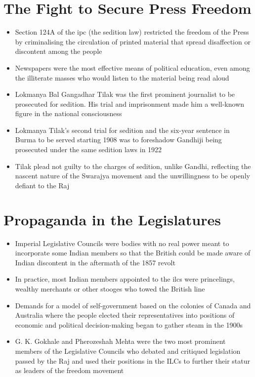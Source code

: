 \section{The Fight to Secure Press Freedom}
\begin{itemize}
    \item Section 124A of the \gls{ipc} (the sedition law) restricted the freedom of the Press by criminalising the circulation of printed material that spread disaffection or discontent among the people
    \item Newspapers were the most effective means of political education, even among the illiterate masses who would listen to the material being read aloud
    \item Lokmanya Bal Gangadhar Tilak was the first prominent journalist to be prosecuted for sedition. His trial and imprisonment made him a well-known figure in the national consciousness
    \item Lokmanya Tilak's second trial for sedition and the six-year sentence in Burma to be served starting 1908 was to foreshadow Gandhiji being prosecuted under the same sedition laws in 1922
    \item Tilak plead not guilty to the charges of sedition, unlike Gandhi, reflecting the nascent nature of the Swarajya movement and the unwillingness to be openly defiant to the Raj
\end{itemize}

\section{Propaganda in the Legislatures}
\begin{itemize}
    \item Imperial Legislative Councils were bodies with no real power meant to incorporate some Indian members so that the British could be made aware of Indian discontent in the aftermath of the 1857 revolt
    \item In practice, most Indian members appointed to the \glspl{ilc} were princelings, wealthy merchants or other stooges who towed the British line
    \item Demands for a model of self-government based on the colonies of Canada and Australia where the people elected their representatives into positions of economic and political decision-making began to gather steam in the 1900s
    \item G. K. Gokhale and Pherozeshah Mehta were the two most prominent members of the Legislative Councils who debated and critiqued legislation passed by the Raj and used their positions in the ILCs to further their statur as leaders of the freedom movement
\end{itemize}

